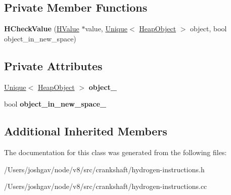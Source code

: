 \subsection*{Private Member Functions}
\begin{DoxyCompactItemize}
\item 
{\bfseries H\+Check\+Value} (\hyperlink{classv8_1_1internal_1_1_h_value}{H\+Value} $\ast$value, \hyperlink{classv8_1_1internal_1_1_unique}{Unique}$<$ \hyperlink{classv8_1_1internal_1_1_heap_object}{Heap\+Object} $>$ object, bool object\+\_\+in\+\_\+new\+\_\+space)\hypertarget{classv8_1_1internal_1_1_h_check_value_a28a7a1d55f916e3c5f33794a54f57371}{}\label{classv8_1_1internal_1_1_h_check_value_a28a7a1d55f916e3c5f33794a54f57371}

\end{DoxyCompactItemize}
\subsection*{Private Attributes}
\begin{DoxyCompactItemize}
\item 
\hyperlink{classv8_1_1internal_1_1_unique}{Unique}$<$ \hyperlink{classv8_1_1internal_1_1_heap_object}{Heap\+Object} $>$ {\bfseries object\+\_\+}\hypertarget{classv8_1_1internal_1_1_h_check_value_ad0a20b3929fa81a1754d92a835fe8ec4}{}\label{classv8_1_1internal_1_1_h_check_value_ad0a20b3929fa81a1754d92a835fe8ec4}

\item 
bool {\bfseries object\+\_\+in\+\_\+new\+\_\+space\+\_\+}\hypertarget{classv8_1_1internal_1_1_h_check_value_a34970ddb2062e2a9587965dc0baca873}{}\label{classv8_1_1internal_1_1_h_check_value_a34970ddb2062e2a9587965dc0baca873}

\end{DoxyCompactItemize}
\subsection*{Additional Inherited Members}


The documentation for this class was generated from the following files\+:\begin{DoxyCompactItemize}
\item 
/\+Users/joshgav/node/v8/src/crankshaft/hydrogen-\/instructions.\+h\item 
/\+Users/joshgav/node/v8/src/crankshaft/hydrogen-\/instructions.\+cc\end{DoxyCompactItemize}
